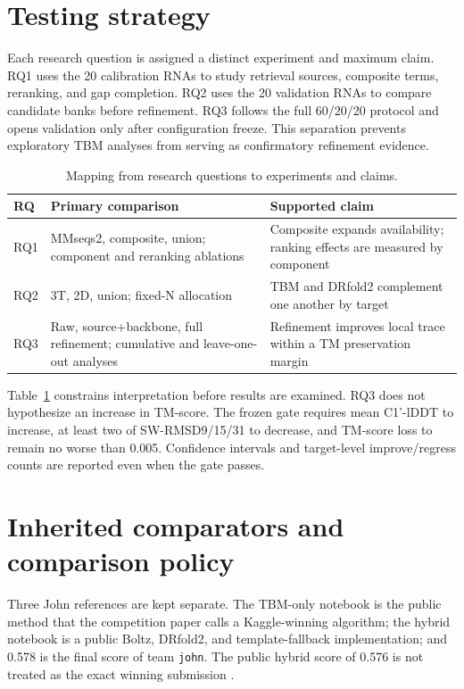 \documentclass[12pt,a4paper,oneside]{report}
\begin{document}
\section{Testing strategy}

Each research question is assigned a distinct experiment and maximum claim. RQ1 uses the
20 calibration RNAs to study retrieval sources, composite terms, reranking, and gap
completion. RQ2 uses the 20 validation RNAs to compare candidate banks before refinement.
RQ3 follows the full 60/20/20 protocol and opens validation only after configuration
freeze. This separation prevents exploratory TBM analyses from serving as confirmatory
refinement evidence.

\begin{table}[H]
\centering
\caption{Mapping from research questions to experiments and claims.}
\label{tab:rq_map_en}
\begin{tabularx}{\textwidth}{p{1.0cm}X X}
\toprule
RQ & Primary comparison & Supported claim \\
\midrule
RQ1 & MMseqs2, composite, union; component and reranking ablations & Composite expands availability; ranking effects are measured by component \\
RQ2 & 3T, 2D, union; fixed-N allocation & TBM and DRfold2 complement one another by target \\
RQ3 & Raw, source+backbone, full refinement; cumulative and leave-one-out analyses & Refinement improves local trace within a TM preservation margin \\
\bottomrule
\end{tabularx}
\end{table}

Table~\ref{tab:rq_map_en} constrains interpretation before results are examined. RQ3 does
not hypothesize an increase in TM-score. The frozen gate requires mean C1'-lDDT to
increase, at least two of SW-RMSD9/15/31 to decrease, and TM-score loss to remain no worse
than 0.005. Confidence intervals and target-level improve/regress counts are reported even
when the gate passes.

\section{Inherited comparators and comparison policy}

Three John references are kept separate. The TBM-only notebook is the public method that
the competition paper calls a Kaggle-winning algorithm; the hybrid notebook is a public
Boltz, DRfold2, and template-fallback implementation; and 0.578 is the final score of team
\texttt{john}. The public hybrid score of 0.576 is not treated as the exact winning
submission \cite{competition_paper,kaggle_top1,kaggle_hybrid}.
\end{document}
